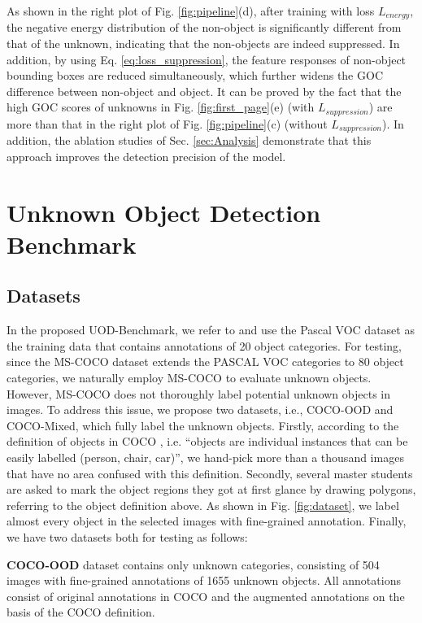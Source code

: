 \documentclass[10pt,twocolumn,letterpaper]{article}
\newcommand{\xf}[1]{{\color{black} #1}}
\begin{document}
As shown in the right plot of Fig. \ref{fig:pipeline}(d),
after training with loss $L_{energy}$,
the negative energy distribution of the non-object is significantly different from that of the unknown,
indicating that the non-objects are indeed suppressed.
In addition,
by using Eq. \ref{eq:loss_suppression},
the feature responses of non-object bounding boxes are reduced simultaneously,
which further widens the GOC difference between non-object and object.
It can be proved by the fact that the high GOC scores of unknowns in Fig. \ref{fig:first_page}(e) (with $L_{suppression}$) are more than that in the right plot of Fig. \ref{fig:pipeline}(c) (without $L_{suppression}$).
In addition,
the ablation studies of Sec. \ref{sec:Analysis} demonstrate that this approach improves the detection precision of the model.

\section{Unknown Object Detection Benchmark}
\label{sec:experimental}

\subsection{Datasets}
In the proposed UOD-Benchmark,
we refer to \cite{vos,owod} 
\xf{and use} the Pascal VOC dataset \cite{voc} as the training data that contains annotations of 20 object categories.
For testing,
since the MS-COCO dataset \cite{lin2014microsoft} extends the PASCAL VOC categories to 80 object categories,
we naturally employ MS-COCO \xf{to evaluate} unknown objects.
However, MS-COCO does not thoroughly label potential unknown objects in images.
To address this issue,
we propose two datasets, i.e., COCO-OOD and COCO-Mixed, which fully \xf{label} the unknown objects.
Firstly,
according to the definition of objects in COCO \cite{lin2014microsoft},
i.e. ``objects are individual instances that can be easily labelled (person, chair, car)'',
we hand-pick more than a thousand images that have no area confused with this definition.
Secondly,
several master students are asked to mark the object regions they got at first glance by drawing polygons,
referring to the object definition above.
As shown in Fig. \ref{fig:dataset},
we label almost every object in the selected images with fine-grained annotation.
Finally, we have two datasets both for testing as follows:

\noindent\textbf{COCO-OOD} dataset \xf{contains only} unknown categories,
consisting of 504 images with ﬁne-grained annotations of 1655 unknown objects.
All annotations consist of original annotations in COCO and the augmented annotations on the basis of the COCO definition.
\end{document}

